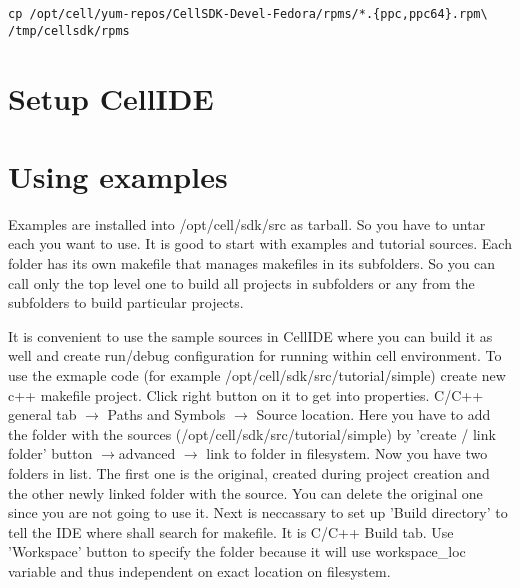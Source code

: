 \begin{verbatim}
cp /opt/cell/yum-repos/CellSDK-Devel-Fedora/rpms/*.{ppc,ppc64}.rpm\
/tmp/cellsdk/rpms
\end{verbatim}

\section{Setup CellIDE}

\section{Using examples}

Examples are installed into /opt/cell/sdk/src as tarball. So you have to untar each you want to use. It is good to start with examples and tutorial sources. Each folder has its own makefile that manages makefiles in its subfolders. So you can call only the top level one to build all projects in subfolders or any from the subfolders to build particular projects.

It is convenient to use the sample sources in CellIDE where you can build it as well and create run/debug configuration for running within cell environment. To use the exmaple code (for example /opt/cell/sdk/src/tutorial/simple) create new c++ makefile project. Click right button on it to get into properties. C/C++ general tab $\rightarrow$ Paths and Symbols $\rightarrow$ Source location. Here you have to add the folder with the sources (/opt/cell/sdk/src/tutorial/simple) by 'create / link folder' button $\rightarrow$advanced $\rightarrow$ link to folder in filesystem. Now you have two folders in list. The first one is the original, created during project creation and the other newly linked folder with the source. You can delete the original one since you are not going to use it.
Next is neccassary to set up 'Build directory' to tell the IDE where shall search for makefile. It is C/C++ Build tab. Use 'Workspace' button to specify the folder because it will use workspace\_loc variable and thus independent on exact location on filesystem.  

